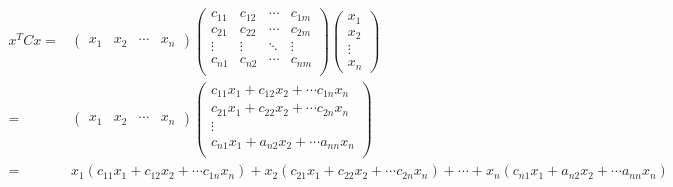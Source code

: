 \begin{align*}
x^T C x
=& 
\begin{pmatrix} x_1 & x_2 & \cdots & x_n\end{pmatrix}
\begin{pmatrix} 
c_{11} & c_{12} & \cdots & c_{1m}\\ 
c_{21} & c_{22} & \cdots & c_{2m}\\
\vdots & \vdots& \ddots & \vdots \\
 c_{n1} & c_{n2} & \cdots & c_{nm}\\
 \end{pmatrix}
\begin{pmatrix} x_1 \\ x_2 \\ \vdots \\x_n\end{pmatrix}\\
=& 
\begin{pmatrix} x_1 & x_2 & \cdots & x_n\end{pmatrix}
\begin{pmatrix} 
c_{11} x_1 + c_{12} x_2 + \cdots c_{1n} x_n\\
c_{21} x_1 + c_{22} x_2 + \cdots c_{2n} x_n\\
\vdots\\
c_{n1} x_1 + a_{n2} x_2 + \cdots a_{nn} x_n\\
\end{pmatrix}\\
=& x_1(c_{11} x_1 + c_{12} x_2 + \cdots c_{1n} x_n)+x_2(c_{21} x_1 + c_{22} x_2 + \cdots c_{2n} x_n) + \cdots + x_n(c_{n1} x_1 + a_{n2} x_2 + \cdots a_{nn} x_n)
\end{align*}